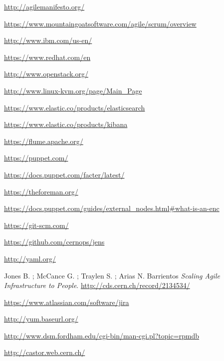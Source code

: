 
\begin{thebibliography}{90}
\rhead[\fancyplain{}{\bfseries \leftmark}]{\fancyplain{}{\bfseries
\thepage}}

\url{http://agilemanifesto.org/}

\url{https://www.mountaingoatsoftware.com/agile/scrum/overview}

\url{http://www.ibm.com/us-en/}

\url{https://www.redhat.com/en}

\url{http://www.openstack.org/}

\url{http://www.linux-kvm.org/page/Main\_Page}

\url{https://www.elastic.co/products/elasticsearch}

\url{https://www.elastic.co/products/kibana}

\url{https://flume.apache.org/}

\url{https://puppet.com/}

\url{https://docs.puppet.com/facter/latest/}

\url{https://theforeman.org/}

\url{https://docs.puppet.com/guides/external\_nodes.html\#what-is-an-enc}

\url{https://git-scm.com/}

\url{https://github.com/cernops/jens}

\url{http://yaml.org/}

Jones B. ; McCance G. ; Traylen S. ; Arias N. Barrientos \newline{}
\textit{Scaling Agile Infrastructure to People}. \newline{}
\url{http://cds.cern.ch/record/2134534/}

\url{https://www.atlassian.com/software/jira}

\url{http://yum.baseurl.org/}

\url{http://www.dsm.fordham.edu/cgi-bin/man-cgi.pl?topic=rpmdb}

\url{http://castor.web.cern.ch/}


\end{thebibliography}
